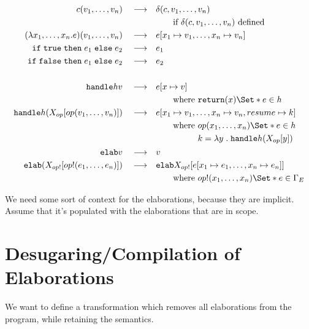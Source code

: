 \documentclass{article}
\newcommand\kw[1]{\ensuremath{\mathbf{\mathtt{#1}}}}
\newcommand\true{\kw{true}}
\newcommand\false{\kw{false}}
\newcommand\return{\kw{return}}
\newcommand\handle{\kw{handle}}
\newcommand\elab{\kw{elab}}
\newcommand\cond[3]{\kw{if}\;#1\;\kw{then}\;#2\;\kw{else}\;#3}
\newcommand\lam[2]{\lambda #1\;.\;#2}
\renewcommand\S{\Set*}
\begin{document}
\newcommand{\reduce}{\quad\longrightarrow\quad}
\begin{align*}
    c(v_1, \dots, v_n) \reduce& \delta(c, v_1, \dots, v_n) \\
    &\qquad\text{if } \delta(c, v_1, \dots, v_n) \text{ defined}\\
    (\lambda x_1, \dots, x_n . e) (v_1, \dots, v_n) \reduce& e[x_1 \mapsto v_1, \dots, x_n \mapsto v_n] \\
    \cond{\true}{e_1}{e_2} \reduce& e_1 \\
    \cond{\false}{e_1}{e_2} \reduce& e_2 \\
    \\
    \handle{h}{v} \reduce& e[x\mapsto v] \\
    &\qquad\text{where } \return(x) \S{ e } \in h\\
    \handle{h}{(X_{op}[op(v_1, \dots, v_n)])} \reduce& e[x_1\mapsto v_1, \dots, x_n\mapsto v_n, resume \mapsto k] \\
    &\qquad \text{where } \begin{aligned}[t]
        & op(x_1, \dots, x_n) \S{e} \in h\\
        & k = \lam{y}{\handle h (X_{op}[y])}
    \end{aligned}\\
    \elab v \reduce& v\\
    \elab (X_{op!}[op!(e_1, \dots, e_n)]) \reduce& \elab X_{op!}[e[x_1 \mapsto e_1, \dots, x_n \mapsto e_n]] \\
    &\qquad \text{where } op!(x_1, \dots, x_n) \S{e} \in \Gamma_E \\
\end{align*}

We need some sort of context for the elaborations, because they are implicit. Assume that it's populated with the elaborations that are in scope.

\section{Desugaring/Compilation of Elaborations}

We want to define a transformation which removes all elaborations from the program, while retaining the semantics.
\end{document}
